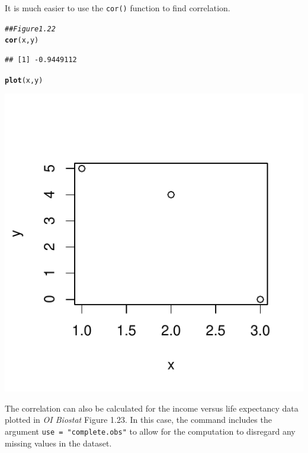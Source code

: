 \documentclass{report}\usepackage[]{graphicx}\usepackage[]{color}
\makeatletter
\def\maxwidth{ %
  \ifdim\Gin@nat@width>\linewidth
    \linewidth
  \else
    \Gin@nat@width
  \fi
}
\newcommand{\hlcom}[1]{\textcolor[rgb]{0.678,0.584,0.686}{\textit{#1}}}%
\newcommand{\hlstd}[1]{\textcolor[rgb]{0.345,0.345,0.345}{#1}}%
\newcommand{\hlkwd}[1]{\textcolor[rgb]{0.737,0.353,0.396}{\textbf{#1}}}%
\newenvironment{kframe}{%
 \def\at@end@of@kframe{}%
 \ifinner\ifhmode%
  \def\at@end@of@kframe{\end{minipage}}%
  \begin{minipage}{\columnwidth}%
 \fi\fi%
 \def\FrameCommand##1{\hskip\@totalleftmargin \hskip-\fboxsep
 \colorbox{shadecolor}{##1}\hskip-\fboxsep
     \hskip-\linewidth \hskip-\@totalleftmargin \hskip\columnwidth}%
 \MakeFramed {\advance\hsize-\width
   \@totalleftmargin\z@ \linewidth\hsize
   \@setminipage}}%
 {\par\unskip\endMakeFramed%
 \at@end@of@kframe}
\newenvironment{knitrout}{}{} %
\makeatother
\begin{document}
It is much easier to use the \texttt{cor()} function to find correlation. 

\begin{knitrout}
\color{fgcolor}\begin{kframe}
\begin{alltt}
\hlcom{## Figure 1.22}
\hlkwd{cor}\hlstd{(x,y)}
\end{alltt}
\begin{verbatim}
## [1] -0.9449112
\end{verbatim}
\begin{alltt}
\hlkwd{plot}\hlstd{(x,y)}
\end{alltt}
\end{kframe}

{\centering \includegraphics[width=\maxwidth]{figure/unnamed-chunk-57-1} 

}



\end{knitrout}

The correlation can also be calculated for the income versus life expectancy data plotted in \textit{OI Biostat} Figure 1.23. In this case, the command includes the argument \texttt{use = "complete.obs"} to allow for the computation to disregard any missing values in the dataset.
\end{document}
